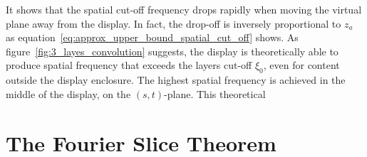 It shows that the spatial cut-off frequency drops rapidly when moving the virtual plane away from the display.
In fact, the drop-off is inversely proportional to $z_a$ as equation~\ref{eq:approx_upper_bound_spatial_cut_off} shows.
As figure~\ref{fig:3_layes_convolution} suggests, the display is theoretically able to produce spatial frequency that exceeds the layers cut-off $\xi_0$, even for content outside the display enclosure.
The highest spatial frequency is achieved in the middle of the display, on the \mbox{$(s, t)$-plane}.
This theoretical 



\section{The Fourier Slice Theorem}

